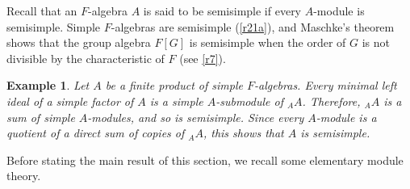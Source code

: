 \documentclass[a4paper,11pt,final]{memoir}%
\newtheorem{example}[X]{Example}
\theoremstyle{nonumberplain}
\begin{document}
Recall that an $F$-algebra $A$ is said to be semisimple if every $A$-module is
semisimple. Simple $F$-algebras are semisimple (\ref{r21a}), and Maschke's
theorem shows that the group algebra $F[G]$ is semisimple when the order of
$G$ is not divisible by the characteristic of $F$ (see \ref{r7}).{}

\begin{example}
\label{r24a}Let $A$ be a finite product of simple $F$-algebras. Every minimal
left ideal of a simple factor of $A$ is a simple $A$-submodule of $_{A}A$.
Therefore, $_{A}A$ is a sum of simple $A$-modules, and so is semisimple. Since
every $A$-module is a quotient of a direct sum of copies of $_{A}A$, this
shows that $A$ is semisimple.
\end{example}

Before stating the main result of this section, we recall some elementary
module theory.
\end{document}
